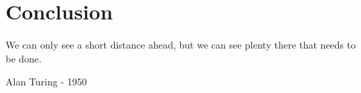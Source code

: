 \chapter{Conclusion}
\epigraph{We can only see a short distance ahead, but we can see plenty there that needs to be done.}{Alan Turing - 1950}